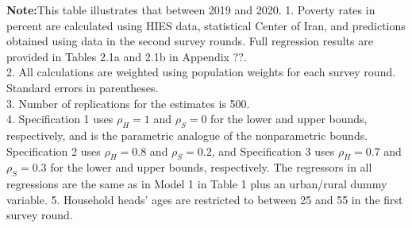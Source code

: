 \documentclass[12pt,a4paper]{article}
\begin{document}
\begin{table}[H]
    
    \vspace{0.5em} 
    \begin{minipage}{\linewidth} 
    \caption*{\scriptsize \textbf{Note:}This table illustrates that between 2019 and  2020.  1. Poverty rates in percent are calculated using HIES data, statistical Center of Iran, and predictions obtained using data in the second survey rounds.
Full regression results are provided in Tables 2.1a and 2.1b in Appendix ??. \\
2. All calculations are weighted using population weights for each survey round. Standard errors in parentheses.\\
3. Number of replications for the estimates is 500.\\
4. Specification 1 uses $\rho_H=1$ and $\rho_S=0$ for the lower and upper bounds, respectively, and is the parametric analogue of the nonparametric bounds. Specification 2
uses $\rho_H=0.8$ and $\rho_S=0.2$, and Specification 3 uses $\rho_H=0.7$ and $\rho_S=0.3$ for the lower and upper bounds, respectively. The regressors in all regressions are the
same as in Model 1 in Table 1 plus an urban/rural dummy variable.
5. Household heads' ages are restricted to between 25 and 55 in the first survey round.} 
    \end{minipage}
\end{table}
\end{document}
